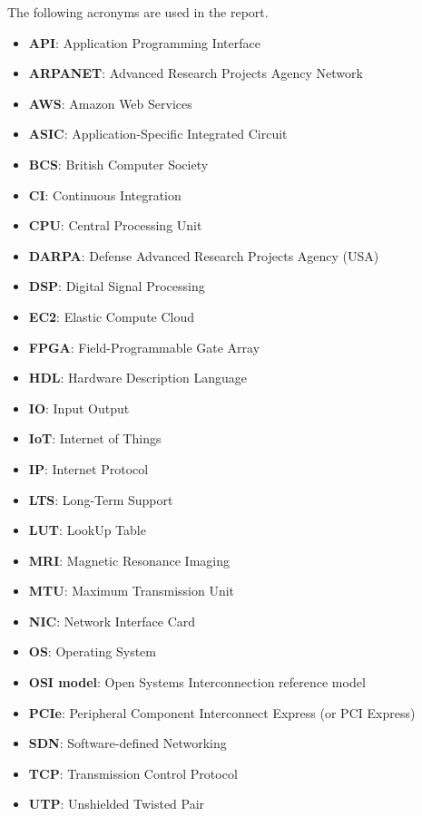 The following acronyms are used in the report.
\begin{itemize}
  \item \textbf{API}: Application Programming Interface
  \item \textbf{ARPANET}: Advanced Research Projects Agency Network
  \item \textbf{AWS}: Amazon Web Services
  \item \textbf{ASIC}: Application-Specific Integrated Circuit
  \item \textbf{BCS}: British Computer Society
  \item \textbf{CI}: Continuous Integration
  \item \textbf{CPU}: Central Processing Unit
  \item \textbf{DARPA}: Defense Advanced Research Projects Agency (USA)
  \item \textbf{DSP}: Digital Signal Processing
  \item \textbf{EC2}: Elastic Compute Cloud
  \item \textbf{FPGA}: Field-Programmable Gate Array
  \item \textbf{HDL}: Hardware Description Language
  \item \textbf{IO}: Input Output
  \item \textbf{IoT}: Internet of Things
  \item \textbf{IP}: Internet Protocol
  \item \textbf{LTS}: Long-Term Support
  \item \textbf{LUT}: LookUp Table
  \item \textbf{MRI}: Magnetic Resonance Imaging
  \item \textbf{MTU}: Maximum Transmission Unit
  \item \textbf{NIC}: Network Interface Card
  \item \textbf{OS}: Operating System
  \item \textbf{OSI model}: Open Systems Interconnection reference model
  \item \textbf{PCIe}: Peripheral Component Interconnect Express (or PCI Express)
  \item \textbf{SDN}: Software-defined Networking
  \item \textbf{TCP}: Transmission Control Protocol
  \item \textbf{UTP}: Unshielded Twisted Pair
\end{itemize}
